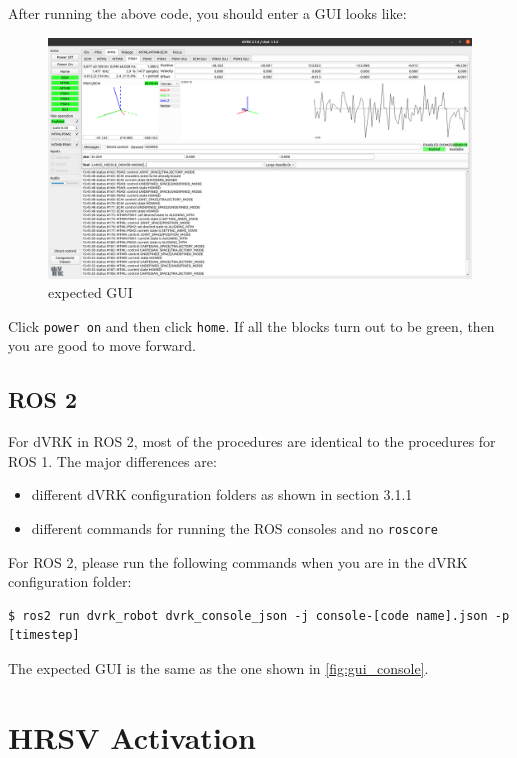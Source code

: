 After running the above code, you should enter a GUI looks like:

\begin{figure}[H]
    \centering
    \includegraphics[width=0.95\linewidth]{figures/console_example.png}
    \caption{expected GUI}
    \label{fig:gui_console}
\end{figure}

Click \texttt{power on} and then click \texttt{home}. If all the blocks turn out to be green, then you are good to move forward.

\subsection{ROS 2}

For dVRK in ROS 2, most of the procedures are identical to the procedures for ROS 1. The major differences are:

\begin{itemize}
    \item different dVRK configuration folders as shown in section 3.1.1
    \item different commands for running the ROS consoles and no \texttt{roscore}
\end{itemize}

For ROS 2, please run the following commands when you are in the dVRK configuration folder:

\begin{verbatim}
$ ros2 run dvrk_robot dvrk_console_json -j console-[code name].json -p [timestep]
\end{verbatim}

The expected GUI is the same as the one shown in \autoref{fig:gui_console}.

\section{HRSV Activation}

